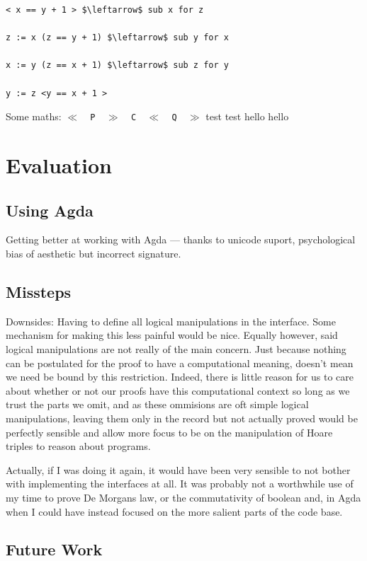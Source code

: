 \documentclass[oneside,12pt]{article}
\begin{document}
\begin{verbatim}
< x == y + 1 > $\leftarrow$ sub x for z
  
z := x (z == y + 1) $\leftarrow$ sub y for x

x := y (z == x + 1) $\leftarrow$ sub z for y

y := z <y == x + 1 >

\end{verbatim}


Some maths: \texttt{$\ll$\!\,\,P\,\,\!$\gg$\!\,\,C\,\,\!$\ll$\!\,\,Q\,\,\!$\gg$} test test hello hello
 
\section{Evaluation}


\subsection{Using Agda}

Getting better at working with Agda --- thanks to unicode suport, psychological bias of aesthetic but incorrect signature.


\subsection{Missteps}


Downsides: Having to define all logical manipulations in the interface. Some mechanism for making this less painful would be nice. Equally however, said logical manipulations are not really of the main concern. Just because nothing can be postulated for the proof to have a computational meaning, doesn't mean we need be bound by this restriction. Indeed, there is little reason for us to care about whether or not our proofs have this computational context so long as we trust the parts we omit, and as these ommisions are oft simple logical manipulations, leaving them only in the record but not actually proved would be perfectly sensible and allow more focus to be on the manipulation of Hoare triples to reason about programs.

Actually, if I was doing it again, it would have been very sensible to not bother with implementing the interfaces at all. It was probably not a worthwhile use of my time to prove De Morgans law, or the commutativity of boolean and, in Agda when I could have instead focused on the more salient parts of the code base.

\subsection{Future Work}
\end{document}
